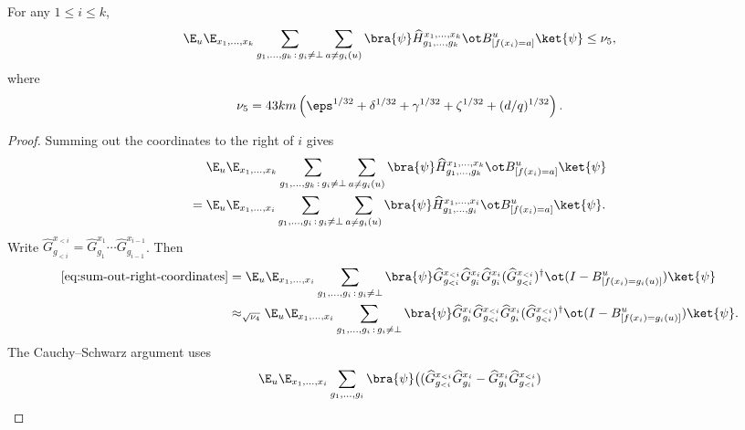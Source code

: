 \begin{lemma}\label{lem:ld-sandwich-line-one-point}
	\leanok
	For any $1 \le i \le k$,
	\[
		\E_u \E_{x_1,\dots,x_k} \sum_{g_1,\dots,g_k\,:\,g_i\ne\bot} \sum_{a\ne g_i(u)}
		\bra{\psi} \widehat H_{g_1,\dots,g_k}^{x_1,\dots,x_k} \ot B_{[f(x_i)=a]}^u \ket{\psi}
		\le \nu_5,
	\]
	where
	\[
		\nu_5 = 43km\left(\eps^{1/32}+\delta^{1/32}+\gamma^{1/32}+\zeta^{1/32}+(d/q)^{1/32}\right).
	\]
\end{lemma}
\begin{proof}
	\leanok
	Summing out the coordinates to the right of $i$ gives
	\begin{equation}\label{eq:sum-out-right-coordinates}
		\begin{aligned}
			    & \E_u \E_{x_1,\dots,x_k} \sum_{g_1,\dots,g_k\,:\,g_i\ne\bot} \sum_{a\ne g_i(u)}
			\bra{\psi} \widehat H_{g_1,\dots,g_k}^{x_1,\dots,x_k} \ot B_{[f(x_i)=a]}^u \ket{\psi} \\
			={} &
			\E_u \E_{x_1,\dots,x_i} \sum_{g_1,\dots,g_i\,:\,g_i\ne\bot} \sum_{a\ne g_i(u)}
			\bra{\psi} \widehat H_{g_1,\dots,g_i}^{x_1,\dots,x_i} \ot B_{[f(x_i)=a]}^u \ket{\psi}.
		\end{aligned}
	\end{equation}
	Write $\widehat G_{g_{<i}}^{x_{<i}} = \widehat G_{g_1}^{x_1}\cdots \widehat G_{g_{i-1}}^{x_{i-1}}$. Then
	\begin{align}
		\eqref{eq:sum-out-right-coordinates}
		 & =
		\E_u \E_{x_1,\dots,x_i} \sum_{g_1,\dots,g_i\,:\,g_i\ne\bot}
		\bra{\psi}
		\widehat G_{g_{<i}}^{x_{<i}} \widehat G_{g_i}^{x_i}\widehat G_{g_i}^{x_i} (\widehat G_{g_{<i}}^{x_{<i}})^\dagger
		\ot (I-B_{[f(x_i)=g_i(u)]}^u)\ket{\psi}\nonumber \\
		 & \approx_{\sqrt{\nu_4}}
		\E_u \E_{x_1,\dots,x_i} \sum_{g_1,\dots,g_i\,:\,g_i\ne\bot}
		\bra{\psi}
		\widehat G_{g_i}^{x_i}\widehat G_{g_{<i}}^{x_{<i}}\widehat G_{g_i}^{x_i}(\widehat G_{g_{<i}}^{x_{<i}})^\dagger
		\ot (I-B_{[f(x_i)=g_i(u)]}^u)\ket{\psi}.
		\label{eq:half-sandwich-first-commutation}
	\end{align}
	The Cauchy--Schwarz argument uses
	\begin{equation}\label{eq:completed-outcome-commutator}
		\E_u \E_{x_1,\dots,x_i} \sum_{g_1,\dots,g_i}
		\bra{\psi}
		\bigl((\widehat G_{g_{<i}}^{x_{<i}}\widehat G_{g_i}^{x_i} - \widehat G_{g_i}^{x_i}\widehat G_{g_{<i}}^{x_{<i}})

\end{equation}
\end{proof}
